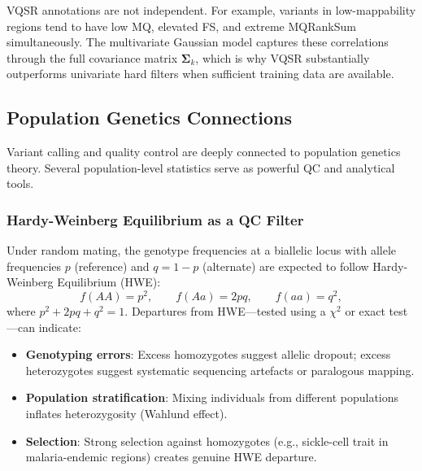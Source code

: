 \begin{warningbox}[title={VQSR Annotation Interactions}]
VQSR annotations are not independent. For example, variants in low-mappability regions tend to have low MQ, elevated FS, and extreme MQRankSum simultaneously. The multivariate Gaussian model captures these correlations through the full covariance matrix $\boldsymbol{\Sigma}_k$, which is why VQSR substantially outperforms univariate hard filters when sufficient training data are available.
\end{warningbox}

\subsection{Population Genetics Connections}
\label{subsec:variants:popgen}

Variant calling and quality control are deeply connected to population genetics theory. Several population-level statistics serve as powerful QC and analytical tools.

\subsubsection{Hardy-Weinberg Equilibrium as a QC Filter}

Under random mating, the genotype frequencies at a biallelic locus with allele frequencies $p$ (reference) and $q = 1 - p$ (alternate) are expected to follow Hardy-Weinberg Equilibrium (HWE):
\begin{equation}
\label{eq:variants:hwe}
f(AA) = p^2, \qquad f(Aa) = 2pq, \qquad f(aa) = q^2,
\end{equation}
where $p^2 + 2pq + q^2 = 1$. Departures from HWE---tested using a $\chi^2$ or exact test---can indicate:

\begin{itemize}[nosep]
  \item \textbf{Genotyping errors}: Excess homozygotes suggest allelic dropout; excess heterozygotes suggest systematic sequencing artefacts or paralogous mapping.
  \item \textbf{Population stratification}: Mixing individuals from different populations inflates heterozygosity (Wahlund effect).
  \item \textbf{Selection}: Strong selection against homozygotes (e.g., sickle-cell trait in malaria-endemic regions) creates genuine HWE departure.
\end{itemize}


